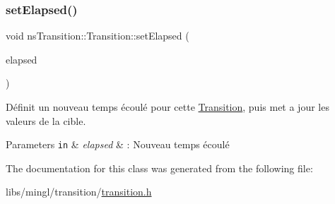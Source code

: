 \subsubsection{\texorpdfstring{set\+Elapsed()}{setElapsed()}}
{\footnotesize\ttfamily void ns\+Transition\+::\+Transition\+::set\+Elapsed (\begin{DoxyParamCaption}\item[{const \hyperlink{namespacens_transition_a260258f249f46ff9a62da721537f87af}{System\+Duration\+\_\+t} \&}]{elapsed }\end{DoxyParamCaption})}



Définit un nouveau temps écoulé pour cette \hyperlink{classns_transition_1_1_transition}{Transition}, puis met a jour les valeurs de la cible. 


\begin{DoxyParams}[1]{Parameters}
\mbox{\tt in}  & {\em elapsed} & \+: Nouveau temps écoulé \\
\hline
\end{DoxyParams}


The documentation for this class was generated from the following file\+:\begin{DoxyCompactItemize}
\item 
libs/mingl/transition/\hyperlink{transition_8h}{transition.\+h}\end{DoxyCompactItemize}
